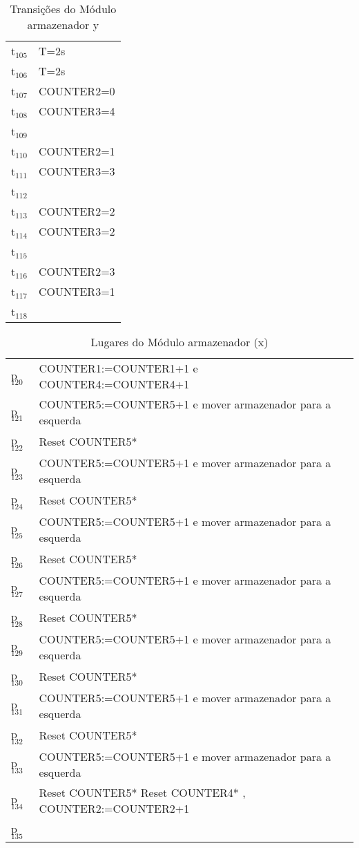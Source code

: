 \begin{table}[htbp]
\caption{Transições do Módulo armazenador y}
\centering
\begin{tabular}{ll}
t\(_{\text{105}}\) & T=2s\\
t\(_{\text{106}}\) & T=2s\\
t\(_{\text{107}}\) & COUNTER2=0\\
t\(_{\text{108}}\) & COUNTER3=4\\
t\(_{\text{109}}\) & \\
t\(_{\text{110}}\) & COUNTER2=1\\
t\(_{\text{111}}\) & COUNTER3=3\\
t\(_{\text{112}}\) & \\
t\(_{\text{113}}\) & COUNTER2=2\\
t\(_{\text{114}}\) & COUNTER3=2\\
t\(_{\text{115}}\) & \\
t\(_{\text{116}}\) & COUNTER2=3\\
t\(_{\text{117}}\) & COUNTER3=1\\
t\(_{\text{118}}\) & \\
\end{tabular}
\end{table}
\begin{table}[htbp]
\caption{Lugares do Módulo armazenador (x)}
\centering
\begin{tabular}{ll}
p\(_{\text{120}}\) & COUNTER1:=COUNTER1+1 e COUNTER4:=COUNTER4+1\\
p\(_{\text{121}}\) & COUNTER5:=COUNTER5+1 e mover armazenador para a esquerda\\
p\(_{\text{122}}\) & Reset COUNTER5*\\
p\(_{\text{123}}\) & COUNTER5:=COUNTER5+1 e mover armazenador para a esquerda\\
p\(_{\text{124}}\) & Reset COUNTER5*\\
p\(_{\text{125}}\) & COUNTER5:=COUNTER5+1 e mover armazenador para a esquerda\\
p\(_{\text{126}}\) & Reset COUNTER5*\\
p\(_{\text{127}}\) & COUNTER5:=COUNTER5+1 e mover armazenador para a esquerda\\
p\(_{\text{128}}\) & Reset COUNTER5*\\
p\(_{\text{129}}\) & COUNTER5:=COUNTER5+1 e mover armazenador para a esquerda\\
p\(_{\text{130}}\) & Reset COUNTER5*\\
p\(_{\text{131}}\) & COUNTER5:=COUNTER5+1 e mover armazenador para a esquerda\\
p\(_{\text{132}}\) & Reset COUNTER5*\\
p\(_{\text{133}}\) & COUNTER5:=COUNTER5+1 e mover armazenador para a esquerda\\
p\(_{\text{134}}\) & Reset COUNTER5* Reset COUNTER4* , COUNTER2:=COUNTER2+1\\
p\(_{\text{135}}\) & \\
\end{tabular}
\end{table}

